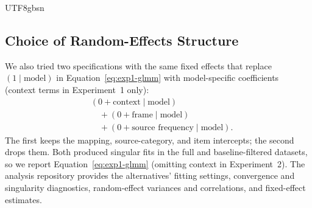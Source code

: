 \documentclass[11pt]{article}
\begin{document}
\begin{CJK*}{UTF8}{gbsn}
\raggedbottom
\subsection{Choice of Random-Effects Structure}
\label{app:random-effects-choice}

We also tried two specifications with the same fixed effects that replace $(1 \mid \text{model})$ in Equation~\ref{eq:exp1-glmm} with model-specific coefficients (context terms in Experiment~1 only):
\begin{equation}
\label{eq:alternative-model-slopes}
\begin{aligned}
&(0 + \text{context} \mid \text{model}) \\
&\quad{}+ (0 + \text{frame} \mid \text{model}) \\
&\quad{}+ (0 + \text{source frequency} \mid \text{model}) .
\end{aligned}
\end{equation}
The first keeps the mapping, source-category, and item intercepts; the second drops them. Both produced singular fits in the full and baseline-filtered datasets, so we report Equation~\ref{eq:exp1-glmm} (omitting context in Experiment~2). The analysis repository provides the alternatives' fitting settings, convergence and singularity diagnostics, random-effect variances and correlations, and fixed-effect estimates.






\end{CJK*}
\end{document}
